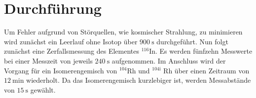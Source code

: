 
\section{Durchführung}
\label{sec:Durchführung}
Um Fehler aufgrund von Störquellen, wie kosmischer Strahlung, zu minimieren wird zunächst ein Leerlauf ohne Isotop über $\SI{900}{\second}$ durchgeführt. Nun folgt zunächst eine Zerfallsmessung des Elementes $^{116}$In. Es werden fünfzehn Messwerte bei
 einer Messzeit von jeweils $\SI{240}{\second}$ aufgenommen. Im Anschluss wird der Vorgang für ein Isomerengemisch von $^{104}$Rh und $^{104\text{i}}$ Rh über einen Zeitraum von $\SI{12}{\minute}$ wiederholt. Da das Isomerengemisch kurzlebiger ist, werden Messabstände von $\SI{15}{\second}$ gewählt.
